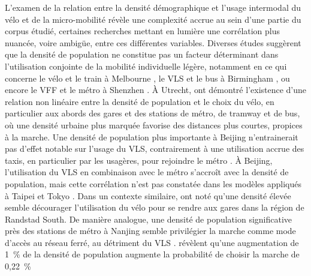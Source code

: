 \begin{refsegment}
L'examen de la relation entre la densité démographique et l'usage intermodal du vélo et de la micro-mobilité révèle une complexité accrue au sein d'une partie du corpus étudié, certaines recherches mettant en lumière une corrélation plus nuancée, voire ambigüe, entre ces différentes variables. Diverses études suggèrent que la densité de population ne constitue pas un facteur déterminant dans l'utilisation conjointe de la mobilité individuelle légère, notamment en ce qui concerne le vélo et le train à Melbourne \textcolor{blue}{\autocite[403]{weliwitiya_bicycle_2019}}, le \acrshort{VLS} et le bus à Birmingham \textcolor{blue}{\autocite[5]{glass_role_2020}}, ou encore le \acrshort{VFF} et le métro à Shenzhen \textcolor{blue}{\autocites[11]{guo_built_2020}[388]{guo_role_2021}}. À Utrecht, \textcolor{blue}{\textcite[274]{krygsman_multimodal_2004}} ont démontré l'existence d'une relation non linéaire entre la densité de population et le choix du vélo, en particulier aux abords des gares et des stations de métro, de tramway et de bus, où une densité urbaine plus marquée favorise des distances plus courtes, propices à la marche. Une densité de population plus importante à Beijing n'entrainerait pas d'effet notable sur l'usage du \acrshort{VLS}, contrairement à une utilisation accrue des taxis, en particulier par les usagères, pour rejoindre le métro \textcolor{blue}{\autocite[15]{ni_exploring_2020}}. À Beijing, l'utilisation du VLS en combinaison avec le métro s'accroît avec la densité de population, mais cette corrélation n'est pas constatée dans les modèles appliqués à Taipei et Tokyo \textcolor{blue}{\autocite[216]{lin_built_2018}}. Dans un contexte similaire, \textcolor{blue}{\textcite[45]{la_paix_puello_modelling_2015}} ont noté qu'une densité élevée semble décourager l'utilisation du vélo pour se rendre aux gares dans la région de Randstad South. De manière analogue, une densité de population significative près des stations de métro à Nanjing semble privilégier la marche comme mode d'accès au réseau ferré, au détriment du \acrshort{VLS} \textcolor{blue}{\autocite[17]{ji_public_2017}}. \textcolor{blue}{\textcite[181]{gan_associations_2021}} révèlent qu'une augmentation de 1~\% de la densité de population augmente la probabilité de choisir la marche de 0,22~\% 
\end{refsegment}
